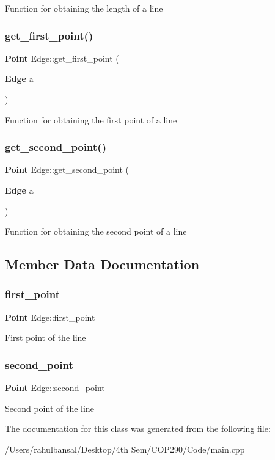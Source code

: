 Function for obtaining the length of a line \mbox{\label{class_edge_ac2d6bca16a1aa91e0aa50ac355c41a7a}} 
\subsubsection{get\+\_\+first\+\_\+point()}
{\footnotesize\ttfamily \textbf{ Point} Edge\+::get\+\_\+first\+\_\+point (\begin{DoxyParamCaption}\item[{\textbf{ Edge}}]{a }\end{DoxyParamCaption})\hspace{0.3cm}{\ttfamily [inline]}}

Function for obtaining the first point of a line \mbox{\label{class_edge_a6cd65aefb09ca02d363fc8a4ad76dac8}} 
\subsubsection{get\+\_\+second\+\_\+point()}
{\footnotesize\ttfamily \textbf{ Point} Edge\+::get\+\_\+second\+\_\+point (\begin{DoxyParamCaption}\item[{\textbf{ Edge}}]{a }\end{DoxyParamCaption})\hspace{0.3cm}{\ttfamily [inline]}}

Function for obtaining the second point of a line 

\subsection{Member Data Documentation}
\mbox{\label{class_edge_a7e1404a5d3313aecf2f8316f1a6cc6e7}} 
\subsubsection{first\+\_\+point}
{\footnotesize\ttfamily \textbf{ Point} Edge\+::first\+\_\+point}

First point of the line \mbox{\label{class_edge_a703566b328e09883ca657973584a7b54}} 
\subsubsection{second\+\_\+point}
{\footnotesize\ttfamily \textbf{ Point} Edge\+::second\+\_\+point}

Second point of the line 

The documentation for this class was generated from the following file\+:\begin{DoxyCompactItemize}
\item 
/\+Users/rahulbansal/\+Desktop/4th Sem/\+C\+O\+P290/\+Code/main.\+cpp\end{DoxyCompactItemize}

